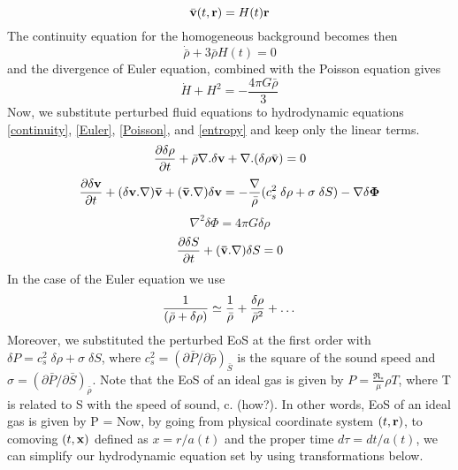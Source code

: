 \documentclass[paper=a4, fontsize=11pt]{scrartcl} %
\numberwithin{equation}{section} %
\numberwithin{figure}{section} %
\numberwithin{table}{section} %
\begin{document}
\begin{equation}
\label{Hubble}
\bar{\bf v}(t, {\bf r}) = H(t){\bf r} 
\end{equation}
The continuity equation for the homogeneous background becomes then
\begin{equation}
\dot{\bar{\rho}} + 3\bar{\rho}H(t) = 0 \nonumber 
\end{equation}
and the divergence of Euler equation, combined with the Poisson equation gives
\begin{equation}
\dot{H} + H^2 = -\frac{4\pi G\bar{\rho}}{3} \nonumber
\end{equation}
Now, we substitute perturbed fluid equations to hydrodynamic equations \ref{continuity}, \ref{Euler}, \ref{Poisson}, and \ref{entropy} and keep only the linear terms.
\begin{equation}
\label{continuity_pert}
\frac{\partial \delta\rho}{\partial t} + \bar{\rho}{\bf \nabla}.\delta {\bf v}  + {\bf \nabla}.(\delta \rho {\bar{\bf v}}) = 0
\end{equation}
\begin{equation}
\label{Euler_pert}
\frac{\partial\delta{\bf v}}{\partial t} + (\delta{\bf v .\nabla}){\bf \bar{v}} +({\bf \bar{v} . \nabla})\delta{\bf v}  = -\frac{{\bf \nabla }}{\bar{\rho}}(c_s^2 \;\delta\rho + \sigma \;\delta S) - {\bf \nabla} \delta{\bf\Phi} 
\end{equation}
\begin{equation}
\label{Poisson_pert}
\nabla ^2 \delta\Phi = 4\pi G \delta\rho
\end{equation}
\begin{equation}
\label{entropy_pert}
\frac{\partial \delta S}{\partial t} + {\bf (\bar{v} .\nabla)}\delta S = 0
\end{equation}
In the case of the Euler equation we use
\begin{equation}
\frac{1}{(\bar{\rho}+\delta\rho)} \simeq \frac{1}{\bar{\rho}} + \frac{\delta\rho}{\bar{\rho}^2}+ \dots \nonumber \\
\end{equation}
Moreover, we substituted the perturbed EoS at the first order with $\delta P = c_s^2 \; \delta\rho + \sigma \; \delta S$, where $c_s^2 = (\partial \bar{P}/\partial \bar{\rho})_{\bar{S}}$ is the square of the sound speed and $\sigma = (\partial \bar{P}/\partial \bar{S})_{\bar{\rho}}$. Note that the EoS of an ideal gas is given by $P = \frac{\Re_*}{\mu} \rho T$, where T is related to S with the speed of sound, c. (how?). In other words, EoS of an ideal gas is given by P =  
Now, by going from physical coordinate system $(t, {\bf r})$, to comoving $(t, {\bf x})$ defined as $x = r/a(t)$ and the proper time $d\tau = dt/a(t)$, we can simplify our hydrodynamic equation set by using transformations below.
\end{document}
